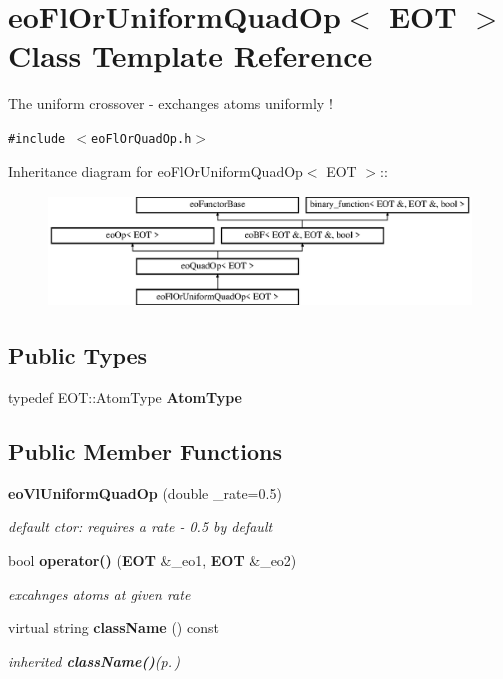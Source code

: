 \section{eo\-Fl\-Or\-Uniform\-Quad\-Op$<$ EOT $>$ Class Template Reference}
\label{classeo_fl_or_uniform_quad_op}
The uniform crossover - exchanges atoms uniformly !  


{\tt \#include $<$eo\-Fl\-Or\-Quad\-Op.h$>$}

Inheritance diagram for eo\-Fl\-Or\-Uniform\-Quad\-Op$<$ EOT $>$::\begin{figure}[H]
\begin{center}
\leavevmode
\includegraphics[height=2.96296cm]{classeo_fl_or_uniform_quad_op}
\end{center}
\end{figure}
\subsection*{Public Types}
\begin{CompactItemize}
\item 
typedef EOT::Atom\-Type {\bf Atom\-Type}\label{classeo_fl_or_uniform_quad_op_w0}

\end{CompactItemize}
\subsection*{Public Member Functions}
\begin{CompactItemize}
\item 
{\bf eo\-Vl\-Uniform\-Quad\-Op} (double \_\-rate=0.5)\label{classeo_fl_or_uniform_quad_op_a0}

\begin{CompactList}\small\item\em default ctor: requires a rate - 0.5 by default \item\end{CompactList}\item 
bool {\bf operator()} ({\bf EOT} \&\_\-eo1, {\bf EOT} \&\_\-eo2)\label{classeo_fl_or_uniform_quad_op_a1}

\begin{CompactList}\small\item\em excahnges atoms at given rate \item\end{CompactList}\item 
virtual string {\bf class\-Name} () const \label{classeo_fl_or_uniform_quad_op_a2}

\begin{CompactList}\small\item\em inherited {\bf class\-Name()}{\rm (p.\,\pageref{classeo_fl_or_uniform_quad_op_a2})} \item\end{CompactList}\end{CompactItemize}

